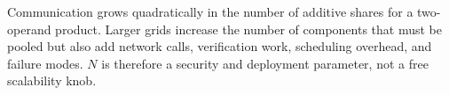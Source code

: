 Communication grows quadratically in the number of additive shares for a two-operand product. Larger grids increase the number of components that must be pooled but also add network calls, verification work, scheduling overhead, and failure modes. $N$ is therefore a security and deployment parameter, not a free scalability knob.
